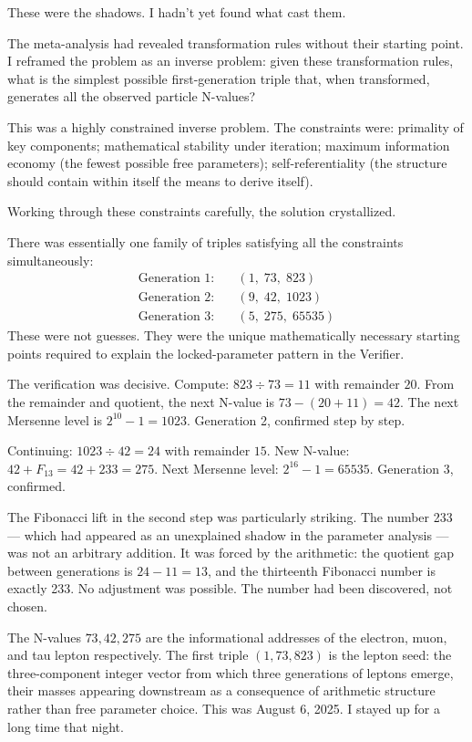 \documentclass[11pt,openany]{book}
\theoremstyle{remark}
\begin{document}
These were the shadows.
I hadn't yet found what cast them.

\medskip

The meta-analysis had revealed transformation rules without their starting point.
I reframed the problem as an inverse problem: given these transformation rules, what is
the simplest possible first-generation triple that, when transformed, generates all the
observed particle N-values?

This was a highly constrained inverse problem.
The constraints were: primality of key components; mathematical stability under iteration;
maximum information economy (the fewest possible free parameters); self-referentiality
(the structure should contain within itself the means to derive itself).

Working through these constraints carefully, the solution crystallized.

There was essentially one family of triples satisfying all the constraints simultaneously:
\begin{align*}
  \text{Generation 1:} &\quad (1,\; 73,\; 823) \\
  \text{Generation 2:} &\quad (9,\; 42,\; 1023) \\
  \text{Generation 3:} &\quad (5,\; 275,\; 65535)
\end{align*}
These were not guesses.
They were the unique mathematically necessary starting points required to explain the
locked-parameter pattern in the Verifier.

The verification was decisive.
Compute: $823 \div 73 = 11$ with remainder $20$.
From the remainder and quotient, the next N-value is $73 - (20 + 11) = 42$.
The next Mersenne level is $2^{10} - 1 = 1023$.
Generation 2, confirmed step by step.

Continuing: $1023 \div 42 = 24$ with remainder $15$.
New N-value: $42 + F_{13} = 42 + 233 = 275$.
Next Mersenne level: $2^{16} - 1 = 65535$.
Generation 3, confirmed.

The Fibonacci lift in the second step was particularly striking.
The number 233 --- which had appeared as an unexplained shadow in the parameter analysis
--- was not an arbitrary addition.
It was forced by the arithmetic: the quotient gap between generations is $24 - 11 = 13$,
and the thirteenth Fibonacci number is exactly 233.
No adjustment was possible.
The number had been discovered, not chosen.

The N-values $73, 42, 275$ are the informational addresses of the electron, muon, and
tau lepton respectively.
The first triple $(1, 73, 823)$ is the lepton seed: the three-component integer vector
from which three generations of leptons emerge, their masses appearing downstream as
a consequence of arithmetic structure rather than free parameter choice.
This was August 6, 2025. I stayed up for a long time that night.
\end{document}
